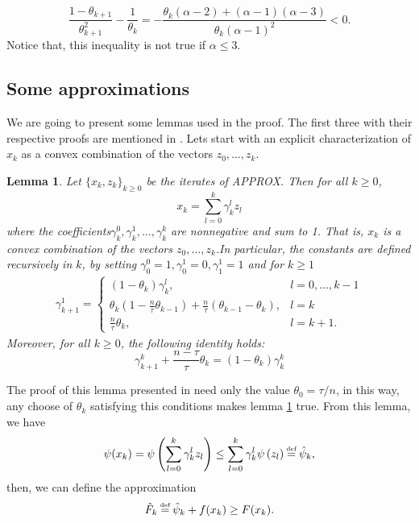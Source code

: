 \documentclass{article}
\newcommand\myeq{\stackrel{\mathclap{\normalfont\mbox{\tiny{def}}}}{=}}
\newtheorem{lema}{Lemma}
\begin{document}
\begin{equation*}
\frac{1-\theta_{k+1}}{\theta_{k+1}^2} - \frac{1}{\theta_k} =  - \frac{\theta_k(\alpha-2)+(\alpha-1)(\alpha-3)}{\theta_k(\alpha-1)^2} < 0.
\end{equation*}
Notice that, this inequality is not  true if $\alpha \leq 3$.

\subsection{Some approximations}

We are going to present some lemmas used in the proof. The first three with their respective proofs are mentioned in \cite{Fercoq_Richtarik}. Lets start with an explicit characterization of $x_k$ as a convex combination of the vectors $z_0,\ldots,z_k$.

\begin{lema}
Let $\lbrace x_k,z_k \rbrace_{k\geq 0}$ be the iterates of APPROX. Then for all $k\geq 0$,
	\begin{equation*}
		x_k = \sum_{l=0}^k \gamma_k^l z_l
	\end{equation*}
where the coefficients$\gamma_k^0,\gamma_k^1,\ldots,\gamma_k^k$ are nonnegative and sum to 1. That is, $x_k$ is a convex combination of the vectors $z_0,\ldots,z_k$.In particular, the constants are defined recursively in $k$, by setting $\gamma_0^0 = 1, \gamma_0^1=0, \gamma_1^1 = 1$ and for $k\geq 1$
	\begin{align}
		\gamma_{k+1}^1 = \begin{cases}
			(1-\theta_k)\gamma_k^l,  &l = 0,\ldots,k-1\\
			\theta_k\left(1-\frac{n}{\tau}\theta_{k-1}\right) + \frac{n}{\tau}(\theta_{k-1}-\theta_k),& l = k \\
			\frac{n}{\tau} \theta_k, &l = k+1.
		\end{cases}
	\end{align}
Moreover, for all $k \geq 0$, the following identity holds:
	\begin{equation*}
		\gamma_{k+1}^k + \frac{n-\tau}{\tau} \theta_k  = (1-\theta_k)\gamma_k^k
	\end{equation*}
\label{lema_2}
\end{lema}
\noindent The proof of this lemma presented in \cite{Fercoq_Richtarik} need only the value $\theta_0 = \tau/n$, in this way, any choose of $\theta_k$ satisfying this conditions makes lemma \ref{lema_2} true. From this lemma, we have
\begin{equation*}
\psi(x_k) = \psi \left(\sum_{l=0}^k \gamma_k^l z_l \right) \leq \sum_{l=0}^k \gamma_k^l \psi \left(z_l \right) \myeq \hat{\psi}_k,
\end{equation*}
then, we can define the approximation
\begin{equation*}
\hat{F}_k \myeq \hat{\psi}_k + f(x_k) \geq F(x_k).
\end{equation*}
\end{document}
